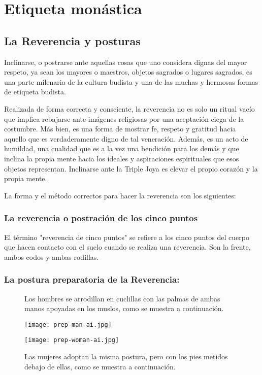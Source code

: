 \chapter{Etiqueta monástica}
\label{etiquette}

\section{La Reverencia y posturas}

Inclinarse, o postrarse ante aquellas cosas que uno considera dignas del mayor respeto, ya sean los mayores o maestros, objetos sagrados o lugares sagrados, es una parte milenaria de la cultura budista y una de las muchas y hermosas formas de etiqueta budista.

Realizada de forma correcta y consciente, la reverencia no es solo un ritual vacío que implica rebajarse ante imágenes religiosas por una aceptación ciega de la costumbre. Más bien, es una forma de mostrar fe, respeto y gratitud hacia aquello que es verdaderamente digno de tal veneración. Además, es un acto de humildad, una cualidad que es a la vez una bendición para los demás y que inclina la propia mente hacia los ideales y aspiraciones espirituales que esos objetos representan. Inclinarse ante la Triple Joya es elevar el propio corazón y la propia mente.

La forma y el método correctos para hacer la reverencia son los siguientes:

\subsection{La reverencia o postración de los cinco puntos}

El término "reverencia de cinco puntos" se refiere a los cinco puntos del cuerpo que hacen contacto con el suelo cuando se realiza una reverencia. Son la frente, ambos codos y ambas rodillas.

\captionsetup{font=small, labelformat=empty, position=above}

\subsection{La postura preparatoria de la Reverencia:}

\begin{figure}[h]
	\centering
	
	\begin{minipage}{0.49\textwidth}
		\centering
		\caption{Los hombres se arrodillan en cuclillas con las palmas de ambas manos apoyadas en los muslos, como se muestra a continuación.}
		\texttt{[image: prep-man-ai.jpg]}
		
	\end{minipage}
	\hfill
	\begin{minipage}{0.49\textwidth}
		\centering
		\caption{Las mujeres adoptan la misma postura, pero con los pies metidos debajo de ellas, como se muestra a continuación.}
		\texttt{[image: prep-woman-ai.jpg]}
		
	\end{minipage}
	
\end{figure}


